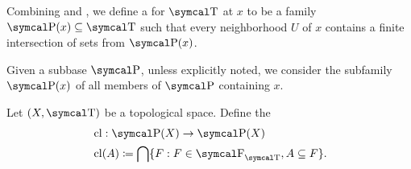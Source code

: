 \begin{definition}\label{def:topological_local_subbase}
  Combining  and , we define a  for \( \CT \) at \( x \) to be a family \( \CP(x) \subseteq \CT \) such that every neighborhood \( U \) of \( x \) contains a finite intersection of sets from \( \CP(x) \).

  Given a subbase \( \CP \), unless explicitly noted, we consider the subfamily \( \CP(x) \) of all members of \( \CP \) containing \( x \).
\end{definition}

\begin{definition}\label{def:closure_operator}\cite[33]{Engelking1989}
  Let \( (X, \CT) \) be a topological space. Define the 
  \begin{align*}
    &\Cl: \Power(X) \to \Power(X) \\
    &\Cl(A) \coloneqq \bigcap \{ F : F \in \CF_{\CT}, A \subseteq F \}.
  \end{align*}
\end{definition}

